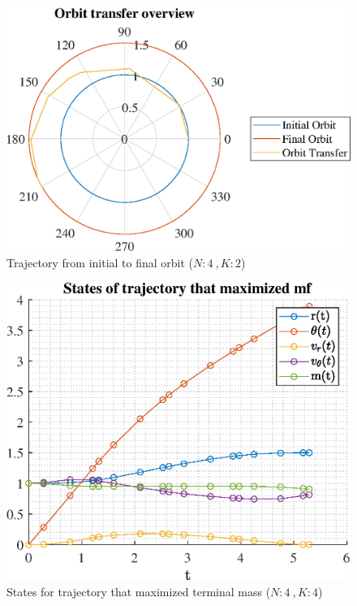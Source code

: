 \documentclass[]{article}
\begin{document}
	\begin{figure}
		\centering
		\includegraphics[scale=0.75]{orbit_N4_K2_C2_mf.eps}
		\caption{Trajectory from initial to final orbit (\(N:4\ , K:2\))}
		\label{fig:orbit_N4_K2_C2_mf}
	\end{figure}
	\begin{figure}
		\centering
		\includegraphics[scale=0.75]{states_N4_K4_C2_mf.eps}
		\caption{States for trajectory that maximized terminal mass (\(N:4\ , K:4\))}
		\label{fig:states_N4_K4_C2_mf}
	\end{figure}
\end{document}
